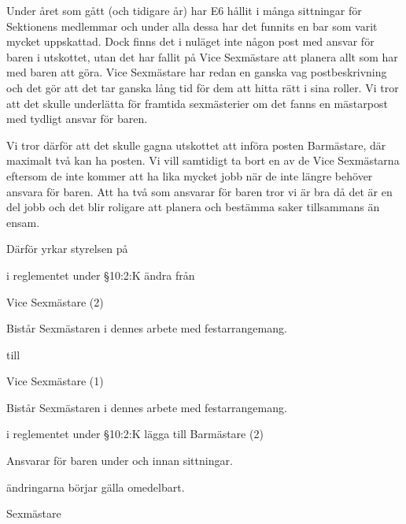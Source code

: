 \documentclass[../_main/handlingar.tex]{subfiles}
\begin{document}
Under året som gått (och tidigare år) har E6 hållit i många sittningar för Sektionens medlemmar och under alla dessa har det funnits en bar som varit mycket uppskattad. Dock finns det i nuläget inte någon post med ansvar för baren i utskottet, utan det har fallit på Vice Sexmästare att planera allt som har med baren att göra. Vice Sexmästare har redan en ganska vag postbeskrivning och det gör att det tar ganska lång tid för dem att hitta rätt i sina roller. Vi tror att det skulle underlätta för framtida sexmästerier om det fanns en mästarpost med tydligt ansvar för baren.

Vi tror därför att det skulle gagna utskottet att införa posten Barmästare, där maximalt två kan ha posten. Vi vill samtidigt ta bort en av de Vice Sexmästarna eftersom de inte kommer att ha lika mycket jobb när de inte längre behöver ansvara för baren. Att ha två som ansvarar för baren tror vi är bra då det är en del jobb och det blir roligare att planera och bestämma saker tillsammans än ensam.

Därför yrkar styrelsen på
\begin{attsatser}
    \att i reglementet under \S10:2:K ändra från\par
      Vice Sexmästare (2)
        \begin{tightdashlist}
            \item Bistår Sexmästaren i dennes arbete med festarrangemang.
        \end{tightdashlist}

        till

          Vice Sexmästare (1)
          \begin{tightdashlist}
              \item Bistår Sexmästaren i dennes arbete med festarrangemang.
          \end{tightdashlist}

      \att i reglementet under §10:2:K lägga till
      Barmästare (2)
      \begin{tightdashlist}
          \item Ansvarar för baren under och innan sittningar.
      \end{tightdashlist}
      \att ändringarna börjar gälla omedelbart.
\end{attsatser}

\begin{signatures}{1}
    \ist
    \signature{Linnea Sjödahl}{Sexmästare}
\end{signatures}
\end{document}
